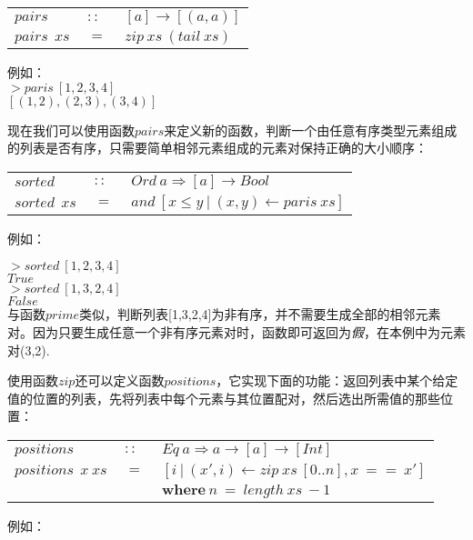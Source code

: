 \begin{tabular}[t]{lll}
  $pairs$&$~::~$&$[a] \rightarrow [(a,a)]$\\
  $pairs~~xs$&$~=~$&$zip~xs~(tail~xs)$
\end{tabular}

\noindent 例如：\\
\noindent\hspace*{1cm}$>paris~[1,2,3,4]$\\
\hspace*{1cm}$[(1,2),(2,3),(3,4)]$

现在我们可以使用函数$pairs$来定义新的函数，判断一个由任意有序类型元素组成的列表是否有序，只需要简单相邻元素组成的元素对保持正确的大小顺序：\\

\begin{tabular}[t]{lll}
  $sorted$&$~::~$&$Ord~a \Rightarrow [a]\rightarrow Bool$\\
  $sorted~~xs$&$~=~$&$and~[x\leq y~|~(x,y) \leftarrow paris~xs] $\\
\end{tabular}

\noindent 例如：

\noindent\hspace*{1cm}$>sorted~[1,2,3,4]$\\
\hspace*{1cm}$True$\\

\noindent\hspace*{1cm}$>sorted~[1,3,2,4]$\\
\hspace*{1cm}$False$\\

与函数$prime$类似，判断列表[1,3,2,4]为非有序，并不需要生成全部的相邻元素对。因为只要生成任意一个非有序元素对时，函数即可返回为\textit{假}，在本例中为元素对(3,2).

使用函数$zip$还可以定义函数$positions$，它实现下面的功能：返回列表中某个给定值的位置的列表，先将列表中每个元素与其位置配对，然后选出所需值的那些位置：

\begin{tabular}[t]{lll}
  $positions$&$~::~$&$Eq~a\Rightarrow a \rightarrow [a] \rightarrow [Int]$\\
  $positions~~x~xs$&$~=~$&$[i~|~(x', i) \leftarrow zip~xs~[0..n], x~==~x']$\\
  &&$\textbf{where}~n~=~length~xs~-1$
\end{tabular}

\noindent 例如：

